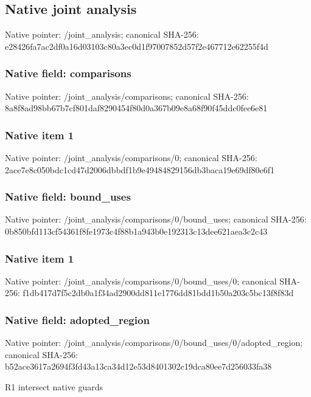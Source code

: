\documentclass[10pt,a4paper]{article}
\begin{document}
\subsection{Native joint analysis}
Native pointer: /joint\_\allowbreak{}analysis; canonical SHA-256: e28426fa7ac2df0a16d03103c80a3ec0d1f97007852d57f2e467712e62255f4d

\subsubsection{Native field: comparisons}
Native pointer: /joint\_\allowbreak{}analysis/comparisons; canonical SHA-256: 8a8f8ad98bb67b7cf801daf8290454f80d0a367b09e8a68f90f45ddc0fee6e81

\subsubsection{Native item 1}
Native pointer: /joint\_\allowbreak{}analysis/comparisons/0; canonical SHA-256: 2ace7e8c050bdc1cd47d2006dbbdf1b9e49484829156db3baca19e69df80e6f1

\subsubsection{Native field: bound\_\allowbreak{}uses}
Native pointer: /joint\_\allowbreak{}analysis/comparisons/0/bound\_\allowbreak{}uses; canonical SHA-256: 0b850bfd113cf54361f8fe1973c4f88b1a943b0e192313c13dee621aea3c2c43

\subsubsection{Native item 1}
Native pointer: /joint\_\allowbreak{}analysis/comparisons/0/bound\_\allowbreak{}uses/0; canonical SHA-256: f1db417d7f5c2db0a1f34ad2900dd811e1776dd81bdd1b50a203c5bc13f8f83d

\subsubsection{Native field: adopted\_\allowbreak{}region}
Native pointer: /joint\_\allowbreak{}analysis/comparisons/0/bound\_\allowbreak{}uses/0/adopted\_\allowbreak{}region; canonical SHA-256: b52ace3617a2694f3fd43a13ca34d12e53d8401302c19dca80ee7d256033fa38

\begingroup\raggedright\sloppy R1 intersect native guards\par\endgroup
\end{document}
